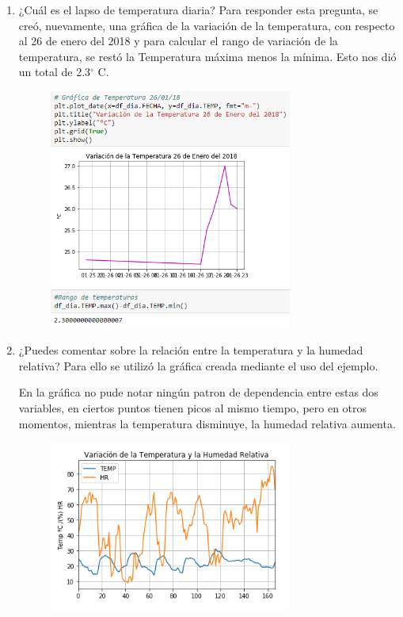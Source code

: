 \documentclass[a4paper]{article}
\begin{document}
\begin{enumerate}
\item ¿Cuál es el lapso de temperatura diaria? Para responder esta pregunta, se creó, nuevamente, una gráfica de la variación de la temperatura, con respecto al 26 de enero del 2018 y para calcular el rango de variación de la temperatura, se restó la Temperatura máxima menos la mínima. Esto nos dió un total de 2.3$^{\circ}$ C.

\begin{figure}[h!]
  \includegraphics[width=8cm]{5.png}
  \centering
  \label{fig:5}
\end{figure}

\item ¿Puedes comentar sobre la relación entre la temperatura y la humedad relativa? Para ello se utilizó la gráfica creada mediante el uso del ejemplo. 

En la gráfica no pude notar ningún patron de dependencia entre estas dos variables, en ciertos puntos tienen picos al mismo tiempo, pero en otros momentos, mientras la temperatura disminuye, la humedad relativa aumenta.

\begin{figure}[h!]
  \includegraphics[width=8cm]{6.png}
  \centering
  \label{fig:6}
\end{figure}


\end{enumerate}
\end{document}
